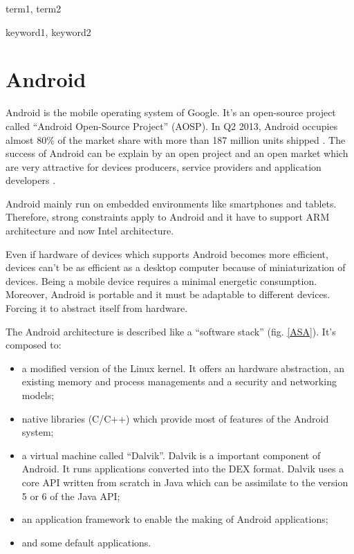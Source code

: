 \documentclass{sigplanconf}
\def \DALVIK{\mbox{Dalvik}\xspace}
\def \ANDROID{\mbox{Android}\xspace}
\def \DEX{\mbox{DEX}\xspace}
\begin{document}
\terms
term1, term2

\keywords
keyword1, keyword2

  \section{Android}

    \ANDROID is the mobile operating system of Google.
    It's an open-source project called ``\ANDROID Open-Source Project'' (AOSP).
    In Q2 2013, \ANDROID occupies almost 80\% of the market share with more than 187 million units shipped \cite{idc-website}.
    The success of \ANDROID can be explain by an open project and an open market
    which are very attractive for devices producers, service providers and application developers \cite{ieee-butler-android-landscape}.

    \ANDROID mainly run on embedded environments like smartphones and tablets.
    Therefore, strong constraints apply to \ANDROID
    and it have to support ARM architecture and now Intel architecture.
    
    Even if hardware of devices which supports \ANDROID becomes more efficient,
    devices can't be as efficient as a desktop computer because of miniaturization of devices.
    Being a mobile device requires a minimal energetic consumption.
    Moreover, \ANDROID is portable and it must be adaptable to different devices.
    Forcing it to abstract itself from hardware.

    The \ANDROID architecture is described like a ``software stack'' (fig. \ref{ASA}).
    It's composed to:
    \begin{itemize}
      \item a modified version of the Linux kernel.
        It offers an hardware abstraction,
        an existing memory and process managements
        and a security and networking models;
      \item native libraries (C/C++)
        which provide most of features of the \ANDROID system;
      \item a virtual machine called ``\DALVIK''. \DALVIK is a important component of \ANDROID.
        It runs applications converted into the \DEX format.
        \DALVIK uses a core API written from scratch in Java
        which can be assimilate to the version 5 or 6 of the Java API;
      \item an application framework to enable the making of \ANDROID applications;
      \item and some default applications.
    \end{itemize}
\end{document}
